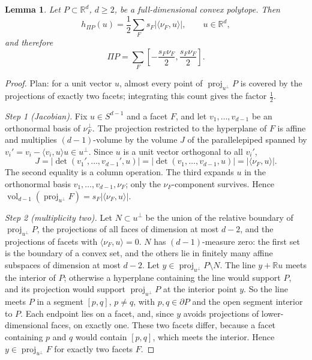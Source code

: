\documentclass[11pt]{article}
\newtheorem{lemma}[theorem]{Lemma}
\newcommand{\R}{\mathbb R}
\DeclareMathOperator{\vol}{vol}
\DeclareMathOperator{\proj}{proj}
\begin{document}
\begin{lemma}\label{lem:facets}
Let \(P\subset\R^d\), \(d\ge2\), be a full-dimensional convex polytope. Then
\begin{equation}\label{eq:facet}
 h_{\Pi P}(u)=\frac12\sum_Fs_F|\langle\nu_F,u\rangle|,\qquad u\in\R^d,
\end{equation}
and therefore
\begin{equation}\label{eq:zonotope}
 \Pi P=\sum_F\left[-\frac{s_F\nu_F}{2},\frac{s_F\nu_F}{2}\right].
\end{equation}
\end{lemma}

\begin{proof}
Plan: for a unit vector \(u\), almost every point of \(\proj_{u^\perp}P\) is covered by the projections of exactly two facets; integrating this count gives the factor \(\tfrac12\).

\emph{Step 1 (Jacobian).} Fix \(u\in S^{d-1}\) and a facet \(F\), and let \(v_1,\ldots,v_{d-1}\) be an orthonormal basis of \(\nu_F^\perp\). The projection restricted to the hyperplane of \(F\) is affine and multiplies \((d-1)\)-volume by the volume \(J\) of the parallelepiped spanned by \(v_i'=v_i-\langle v_i,u\rangle u\in u^\perp\). Since \(u\) is a unit vector orthogonal to all \(v_i'\),
\[
 J=|\det(v_1',\ldots,v_{d-1}',u)|=|\det(v_1,\ldots,v_{d-1},u)|=|\langle\nu_F,u\rangle|.
\]
The second equality is a column operation. The third expands \(u\) in the orthonormal basis \(v_1,\ldots,v_{d-1},\nu_F\); only the \(\nu_F\)-component survives. Hence \(\vol_{d-1}(\proj_{u^\perp}F)=s_F|\langle\nu_F,u\rangle|\).

\emph{Step 2 (multiplicity two).} Let \(N\subset u^\perp\) be the union of the relative boundary of \(\proj_{u^\perp}P\), the projections of all faces of dimension at most \(d-2\), and the projections of facets with \(\langle\nu_F,u\rangle=0\). \(N\) has \((d-1)\)-measure zero: the first set is the boundary of a convex set, and the others lie in finitely many affine subspaces of dimension at most \(d-2\). Let \(y\in\proj_{u^\perp}P\setminus N\). The line \(y+\R u\) meets the interior of \(P\); otherwise a hyperplane containing the line would support \(P\), and its projection would support \(\proj_{u^\perp}P\) at the interior point \(y\). So the line meets \(P\) in a segment \([p,q]\), \(p\ne q\), with \(p,q\in\partial P\) and the open segment interior to \(P\). Each endpoint lies on a facet, and, since \(y\) avoids projections of lower-dimensional faces, on exactly one. These two facets differ, because a facet containing \(p\) and \(q\) would contain \([p,q]\), which meets the interior. Hence \(y\in\proj_{u^\perp}F\) for exactly two facets \(F\).


\end{proof}
\end{document}
